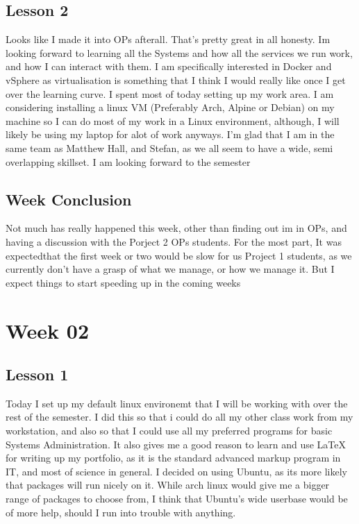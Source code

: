 \documentclass{article}
\begin{document}
\subsection{Lesson 2}
	Looks like I made it into OPs afterall. That's pretty great in all honesty. Im looking forward to learning all the Systems and how all the services we run work, and how I can interact with them. I am specifically interested in Docker and vSphere as virtualisation is something that I think I would really like once I get over the learning curve. I spent most of today setting up my work area. I am considering installing a linux VM (Preferably Arch, Alpine or Debian) on my machine so I can do most of my work in a Linux environment, although, I will likely be using my laptop for alot of work anyways. I'm glad that I am in the same team as Matthew Hall, and Stefan, as we all seem to have a wide, semi overlapping skillset. I am looking forward to the semester

\subsection{Week Conclusion}
	Not much has really happened this week, other than finding out im in OPs, and having a discussion with the Porject 2 OPs students. For the most part, It was expectedthat the first week or two would be slow for us Project 1 students, as we currently don't have a grasp of what we manage, or how we manage it. But I expect things to start speeding up in the coming weeks

\section{Week 02}
\subsection{Lesson 1}
	Today I set up my default linux environemt that I will be working with over the rest of the semester. I did this so that i could do all my other class work from my workstation, and also so that I could use all my preferred programs for basic Systems Administration. It also gives me a good reason to learn and use LaTeX for writing up my portfolio, as it is the standard advanced markup program in IT, and most of science in general. I decided on using Ubuntu, as its more likely that packages will run nicely on it. While arch linux would give me a bigger range of packages to choose from, I think that Ubuntu's wide userbase would be of more help, should I run into trouble with anything.
\end{document}
